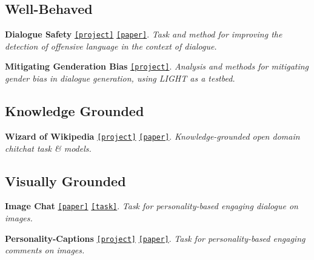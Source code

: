 \subsection*{Well-\/\+Behaved}


\begin{DoxyItemize}
\item {\bfseries Dialogue Safety} \href{https://parl.ai/projects/dialogue_safety/}{\tt \mbox{[}project\mbox{]}} \href{https://arxiv.org/abs/1908.06083}{\tt \mbox{[}paper\mbox{]}}. {\itshape Task and method for improving the detection of offensive language in the context of dialogue.}
\item {\bfseries Mitigating Genderation Bias} \href{https://parl.ai/projects/genderation_bias/}{\tt \mbox{[}project\mbox{]}}. {\itshape Analysis and methods for mitigating gender bias in dialogue generation, using L\+I\+G\+HT as a testbed.}
\end{DoxyItemize}

\subsection*{Knowledge Grounded}


\begin{DoxyItemize}
\item {\bfseries Wizard of Wikipedia} \href{http://parl.ai/projects/wizard_of_wikipedia/}{\tt \mbox{[}project\mbox{]}} \href{https://openreview.net/forum?id=r1l73iRqKm}{\tt \mbox{[}paper\mbox{]}}. {\itshape Knowledge-\/grounded open domain chitchat task \& models.}
\end{DoxyItemize}

\subsection*{Visually Grounded}


\begin{DoxyItemize}
\item {\bfseries Image Chat} \href{https://klshuster.github.io/image_chat/}{\tt \mbox{[}paper\mbox{]}} \href{https://github.com/facebookresearch/ParlAI/tree/master/parlai/tasks/image_chat}{\tt \mbox{[}task\mbox{]}}. {\itshape Task for personality-\/based engaging dialogue on images.}
\item {\bfseries Personality-\/\+Captions} \href{http://parl.ai/projects/personality_captions/}{\tt \mbox{[}project\mbox{]}} \href{https://arxiv.org/abs/1810.10665}{\tt \mbox{[}paper\mbox{]}}. {\itshape Task for personality-\/based engaging comments on images.}
\end{DoxyItemize}

